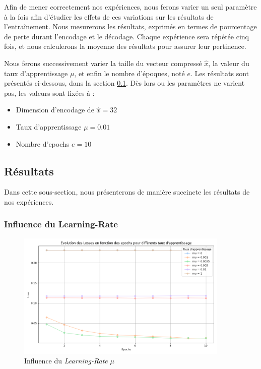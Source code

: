 \documentclass{article}
\begin{document}
\noindent Afin de mener correctement nos expériences, nous ferons varier un seul paramètre à la fois afin d'étudier les effets de ces variations sur les résultats de l'entraînement. Nous mesurerons les résultats, exprimés en termes de pourcentage de perte durant l'encodage et le décodage. Chaque expérience sera répétée cinq fois, et nous calculerons la moyenne des résultats pour assurer leur pertinence. \\

\vspace{-0.5em}

\noindent Nous ferons successivement varier la taille du vecteur compressé $\hat{x}$, la valeur du taux d'apprentissage $\mu$, et enfin le nombre d'époques, noté $e$. Les résultats sont présentés ci-dessous, dans la section \ref{subsec:res}. Dès lors ou les paramètres ne varient pas, les valeurs sont fixées à :

\vspace{0.5em}

\begin{itemize}
    \item Dimension d'encodage de $\hat{x} = 32$
    \item Taux d'apprentissage $\mu = 0.01$
    \item Nombre d'epochs $e = 10$
\end{itemize}


\subsection{Résultats}
\label{subsec:res}

\noindent Dans cette sous-section, nous présenterons de manière succincte les résultats de nos expériences.

\subsubsection{Influence du Learning-Rate}

\vspace{-0.5em}

\begin{figure}[H]
    \centering
    \includegraphics[width=0.9\textwidth]{src/learning_rate.png}
    \vspace{-1em}
    \caption{Influence du \textit{Learning-Rate} $\mu$}
    \label{fig:learning_rate}
\end{figure}
\end{document}
